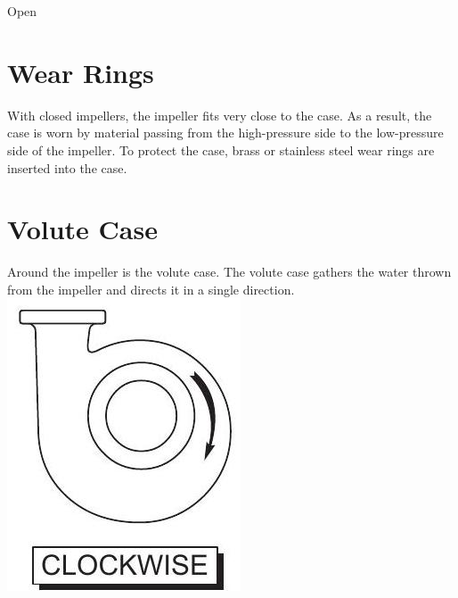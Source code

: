 \documentclass[10pt]{article}
\begin{document}
Open

\section{Wear Rings}
With closed impellers, the impeller fits very close to the case. As a result, the case is worn by material passing from the high-pressure side to the low-pressure side of the impeller. To protect the case, brass or stainless steel wear rings are inserted into the case.

\section{Volute Case}
Around the impeller is the volute case. The volute case gathers the water thrown from the impeller and directs it in a single direction.\\

\includegraphics[max width=\textwidth]{2022_11_03_65aa625ded296bdfd01fg-07}
\end{document}
